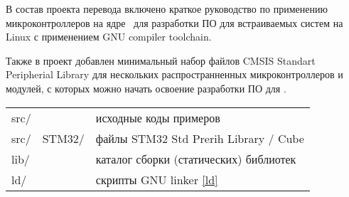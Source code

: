 \pagebreak
{}\secdown

В состав проекта перевода включено краткое руководство по применению
микроконтроллеров на ядре \cm{}\ для разработки ПО для встраиваемых систем
на Linux с применением GNU compiler toolchain.

\bigskip\noindent
Также в проект добавлен минимальный набор файлов CMSIS Standart Peripherial
Library для нескольких распространненных микроконтроллеров и модулей, с которых
можно начать освоение разработки ПО для \cm{}.

\bigskip
\begin{tabular}{l ll}
src/ && исходные коды примеров \\
src/ & STM32/ & файлы STM32 Std Prerih Library / Cube \\
lib/ && каталог сборки (статических) библиотек \\
ld/ && скрипты GNU linker \ref{ld} \\
\end{tabular}





\secup

